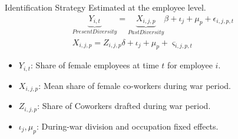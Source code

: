 \begin{frame}{Identification Strategy}
Estimated at the employee level.
\begin{gather*}
\underbrace{Y_{i,t}}_{Present Diversity} = \underbrace{X_{i,j,p}}_{Past Diversity} \beta + \iota_j + \mu_p + \epsilon_{i,j,p,t} \\
    X_{i,j,p} = Z_{i,j,p} \delta + \iota_j + \mu_p + \varsigma_{i,j,p,t}
\end{gather*}
\begin{itemize}
    \item \( Y_{i,t} \): Share of female employees at time \(t\) for employee $i$.
    \item \( X_{i,j,p} \): Mean share of female co-workers during war period.
    \item \( Z_{i,j,p} \): Share of Coworkers drafted during war period.
    \item \( \iota_j, \mu_p\): During-war division and occupation fixed effects.
\end{itemize}
\end{frame}
